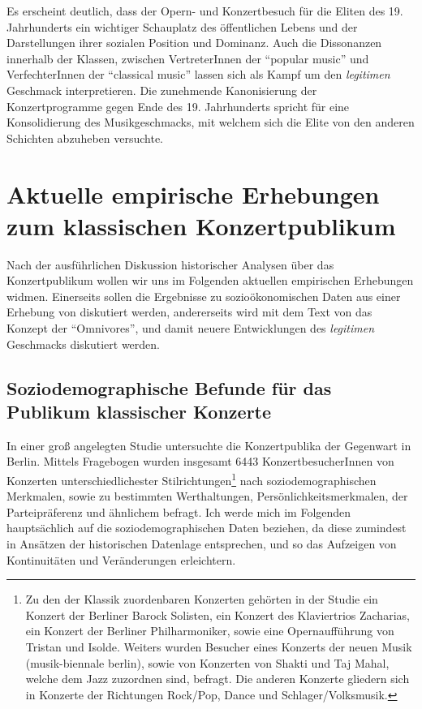 \documentclass[a4paper, german, oneside]{scrbook}
\begin{document}
Es erscheint deutlich, dass der Opern- und Konzertbesuch für die Eliten des 19. Jahrhunderts ein wichtiger Schauplatz des öffentlichen Lebens und der Darstellungen ihrer sozialen Position und Dominanz. Auch die Dissonanzen innerhalb der Klassen, zwischen VertreterInnen der \enquote{popular music} und VerfechterInnen der \enquote{classical music} lassen sich als Kampf um den \emph{legitimen} Geschmack interpretieren. Die zunehmende Kanonisierung der Konzertprogramme gegen Ende des 19. Jahrhunderts spricht für eine Konsolidierung des Musikgeschmacks, mit welchem sich die Elite von den anderen Schichten abzuheben versuchte. \parencite[vgl.][127]{muller_publikum_2014}





\chapter{Aktuelle empirische Erhebungen zum klassischen Konzertpublikum}
Nach der ausführlichen Diskussion historischer Analysen über das Konzertpublikum wollen wir uns im Folgenden aktuellen empirischen Erhebungen widmen. Einerseits sollen die Ergebnisse zu sozioökonomischen Daten aus einer Erhebung von \textcite{de_la_motte-haber_konzertpublika_2007} diskutiert werden, andererseits wird mit dem Text von \textcite{gebesmair_grundzuge_2001} das Konzept der \enquote{Omnivores}, und damit neuere Entwicklungen des \emph{legitimen} Geschmacks diskutiert werden.

\section{Soziodemographische Befunde für das Publikum klassischer Konzerte}
In einer groß angelegten Studie untersuchte \textcite{de_la_motte-haber_konzertpublika_2007} die Konzertpublika der Gegenwart in Berlin. Mittels Fragebogen wurden insgesamt 6443 KonzertbesucherInnen von Konzerten unterschiedlichester Stilrichtungen\footnote{Zu den der Klassik zuordenbaren Konzerten gehörten in der Studie ein Konzert der Berliner Barock Solisten, ein Konzert des Klaviertrios Zacharias, ein Konzert der Berliner Philharmoniker, sowie eine Opernaufführung von Tristan und Isolde. Weiters wurden Besucher eines Konzerts der neuen Musik (musik-biennale berlin), sowie von Konzerten von Shakti und Taj Mahal, welche dem Jazz zuzordnen sind, befragt. Die anderen Konzerte gliedern sich in Konzerte der Richtungen Rock/Pop, Dance und Schlager/Volksmusik.} nach soziodemographischen Merkmalen, sowie zu bestimmten Werthaltungen, Persönlichkeitsmerkmalen, der Parteipräferenz und ähnlichem befragt. Ich werde mich im Folgenden hauptsächlich auf die soziodemographischen Daten beziehen, da diese zumindest in Ansätzen der historischen Datenlage entsprechen, und so das Aufzeigen von Kontinuitäten und Veränderungen erleichtern.
\end{document}
